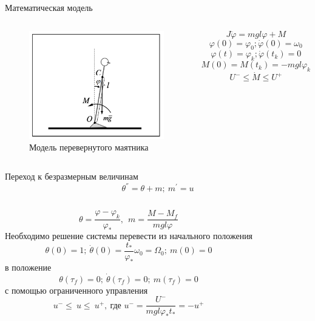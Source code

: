 \documentclass[10pt]{beamer}
\begin{document}
\begin{frame}{Математическая модель}
	\begin{columns}
		\begin{figure}[h!]
			\includegraphics[width=1\linewidth]{images/inverse_pendulum.png}
			\caption{Модель перевернутого маятника}
		\end{figure}

		\[
			J\ddot{\varphi}=mgl\varphi+M
		\]
		\[
			\varphi(0)=\varphi_0; \dot{\varphi}(0)=\omega_0
		\]
		\[
			\varphi(t)=\varphi_k; \dot{\varphi}(t_k)=0
		\]
		\[
			M(0)=M(t_k)=-mgl\varphi_k
		\]
		\[
			U^-\leq\dot{M}\leq U^+
		\]
	\end{columns}
\end{frame}


\begin{frame}{Переход к безразмерным величинам}
	\[
		\theta^{''}=\theta+m;\ m^{'}=u
	\]
	\begin{columns}
		\column{0.3\textwidth}
		\[
			\theta=\frac{\varphi-\varphi_k}{\varphi_\ast},\ \ m=\frac{M-M_f}{mgl\varphi}
		\]
		\column{0.6\textwidth}
		Необходимо решение системы
		перевести из начального положения
		\[
			\theta(0)=1;\ \dot{\theta}(0)=\frac{t_\ast}{\varphi_\ast}\omega_0=\Omega_0;\ m(0)=0
		\]
		в положение
		\[
			\theta(\tau_f)=0;\ \dot{\theta}(\tau_f)=0;\ m(\tau_f)=0
		\]
		с помощью ограниченного управления
		\[
			u^-\le\ u\le\ u^+,\ \text{где } u^-=\frac{U^-}{mgl\varphi_\ast t_\ast}=-u^+
		\]

	\end{columns}
\end{frame}
\end{document}
